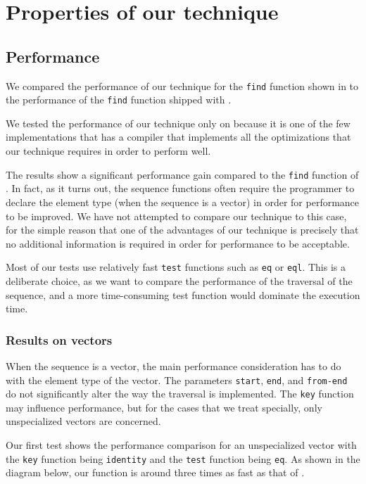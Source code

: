 \section{Properties of our technique}

\subsection{Performance}

We compared the performance of our technique for the \texttt{find}
function shown in  to the
performance of the \texttt{find} function shipped with \sbcl{}.

We tested the performance of our technique only on \sbcl{} because it
is one of the few implementations that has a compiler that implements
all the optimizations that our technique requires in order to perform
well.

The results show a significant performance gain compared to the
\texttt{find} function of \sbcl{}.  In fact, as it turns out, the
\sbcl{} sequence functions often require the programmer to declare the
element type (when the sequence is a vector) in order for performance
to be improved.  We have not attempted to compare our technique to
this case, for the simple reason that one of the advantages of our
technique is precisely that no additional information is required in
order for performance to be acceptable.

Most of our tests use relatively fast \texttt{test} functions such as
\texttt{eq} or \texttt{eql}.  This is a deliberate choice, as we
want to compare the performance of the traversal of the sequence,
and a more time-consuming test function would dominate the execution
time.

\subsubsection{Results on vectors}

When the sequence is a vector, the main performance consideration has
to do with the element type of the vector.  The parameters
\texttt{start}, \texttt{end}, and \texttt{from-end} do not
significantly alter the way the traversal is implemented.  The
\texttt{key} function may influence performance, but for the cases
that we treat specially, only unspecialized vectors are concerned.

Our first test shows the performance comparison for an unspecialized
vector with the \texttt{key} function being \texttt{identity} and the
\texttt{test} function being \texttt{eq}.  As shown in the diagram
below, our function is around three times as fast as that of \sbcl{}.

